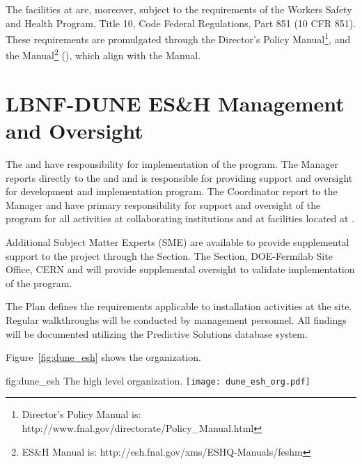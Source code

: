 The  facilities at  are, moreover, subject to
the requirements of the  Workers Safety and Health Program,
Title 10, Code Federal Regulations, Part 851 (10 CFR 851). These
requirements are promulgated through the \fnal Director's Policy
Manual\footnote{\fnal Director's Policy Manual is:
  http://www.fnal.gov/directorate/Policy\_Manual.html}, and the \fnal
{} Manual\footnote{\fnal ES\&H Manual is:
  http://esh.fnal.gov/xms/ESHQ-Manuals/feshm} (), which
align with the   Manual.


\section{LBNF-DUNE ES\&H Management and Oversight}

The  and  have responsibility for
implementation of the   program.  The
  Manager reports directly to the
 and  and is responsible for providing
 support and oversight for development and implementation
  program. The  
Coordinator report to the  
Manager and have primary responsibility for  support and
oversight of the   program for all activities
at collaborating institutions and at 
facilities located at .

Additional  Subject Matter Experts (SME) are available to provide
supplemental support to the project through the \fnal {}
Section. The \fnal {} Section, DOE-Fermilab Site Office, CERN and
 will provide supplemental  oversight to validate
implementation of the    program.

The   Plan defines the 
requirements applicable to installation activities at the 
site. Regular  walkthroughs will be conducted by
  management personnel. All
findings will be documented utilizing the \fnal Predictive Solutions
database system.

Figure~\ref{fig:dune_esh} shows the   organization.
\begin{dunefigure}{fig:dune_esh}
  {The high level   organization.}
  \texttt{[image: dune\_esh\_org.pdf]}
\end{dunefigure}




